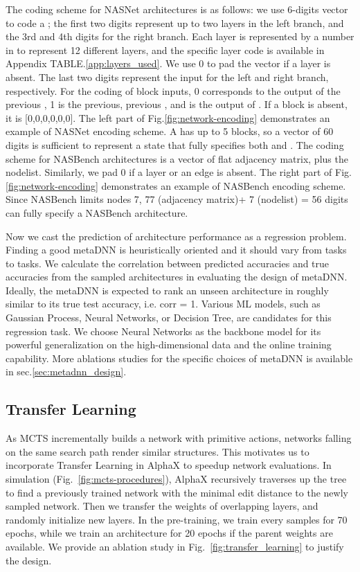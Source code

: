 \documentclass[10pt,twocolumn,letterpaper]{article}
\begin{document}
The coding scheme for NASNet architectures is as follows: we use 6-digits vector to code a ; the first two digits represent up to two layers in the left branch, and the 3rd and 4th digits for the right branch. Each layer is represented by a number in  to represent 12 different layers, and the specific layer code is available in Appendix TABLE.\ref{app:layers_used}. We use 0 to pad the vector if a layer is absent. The last two digits represent the input for the left and right branch, respectively. For the coding of block inputs, 0 corresponds to the output of the previous , 1 is the previous, previous , and  is the output of . If a block is absent, it is [0,0,0,0,0,0]. The left part of Fig.\ref{fig:network-encoding} demonstrates an example of NASNet encoding scheme. A  has up to 5 blocks, so a vector of 60 digits is sufficient to represent a state that fully specifies both  and . The coding scheme for NASBench architectures is a vector of flat adjacency matrix, plus the nodelist. Similarly, we pad 0 if a layer or an edge is absent. The right part of Fig.\ref{fig:network-encoding} demonstrates an example of NASBench encoding scheme. Since NASBench limits nodes  7, 77 (adjacency matrix)+ 7 (nodelist) = 56 digits can fully specify a NASBench architecture.

Now we cast the prediction of architecture performance as a regression problem. Finding a good metaDNN is heuristically oriented and it should vary from tasks to tasks. We calculate the correlation between predicted accuracies and true accuracies from the sampled architectures in evaluating the design of metaDNN. Ideally, the metaDNN is expected to rank an unseen architecture in roughly similar to its true test accuracy, i.e. corr = 1. Various ML models, such as Gaussian Process, Neural Networks, or Decision Tree, are candidates for this regression task. We choose Neural Networks as the backbone model for its powerful generalization on the high-dimensional data and the online training capability. More ablations studies for the specific choices of metaDNN is available in sec.\ref{sec:metadnn_design}.

\subsection{ Transfer Learning }
As MCTS incrementally builds a network with primitive actions, networks falling on the same search path render similar structures. This motivates us to incorporate Transfer Learning in AlphaX to speedup network evaluations. In simulation (Fig.~\ref{fig:mcts-procedures}), AlphaX recursively traverses up the tree to find a previously trained network with the minimal edit distance to the newly sampled network. Then we transfer the weights of overlapping layers, and randomly initialize new layers. In the pre-training, we train every samples for 70 epochs, while we train an architecture for 20 epochs if the parent weights are available. We provide an ablation study in Fig.~\ref{fig:transfer_learning} to justify the design.    
\end{document}
